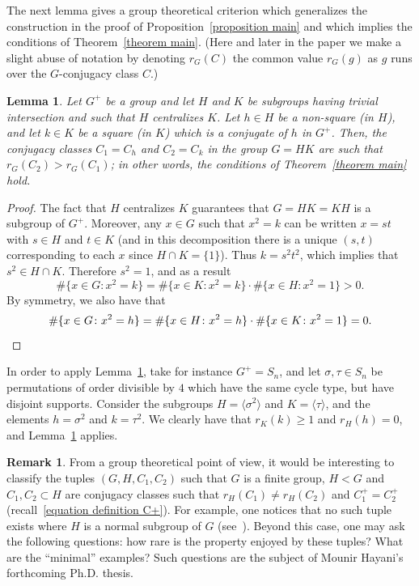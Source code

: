 \documentclass[JEP,XML,SOM,Unicode,NoEqCountersInSection,NoFloatCountersInSection,published]{cedram}
\newtheorem{lemma}[X]{Lemma}
\theoremstyle{definition}
\newtheorem*{remark*}{Remark}
\begin{document}
The next lemma gives a
group theoretical criterion which generalizes the construction in the proof of Proposition~\ref{proposition main} and which implies the conditions of Theorem~\ref{theorem main}. (Here and later in the paper we make a slight abuse of notation by denoting $r_G(C)$ the common value $r_G(g)$ as $g$ runs over the $G$-conjugacy class $C$.)

\begin{lemma}
Let $G^+$ be a group and let $H$ and $K$ be subgroups having trivial intersection and such that $H$ centralizes $K$. Let $h\in H$ be a non-square (in $H$), and let $k\in K$ be a square (in $K$) which is a conjugate of $h$ in $G^+$. Then, the conjugacy classes $C_1=C_h$ and $C_2=C_k$ in the group $G=HK$ are such that $r_G(C_2)> r_G(C_1) $; in other words, the conditions of Theorem~\ref{theorem main} hold.

\label{lemma criterion}
\end{lemma}

\begin{proof}
The fact that $H$ centralizes $K$ guarantees that $G=HK=KH$ is a subgroup of $G^+$. Moreover, any $x\in G$ such that $x^2=k$ can be written $x=st$ with $s\in H$ and $t\in K$ (and in this decomposition there is a unique $(s,t)$ corresponding to each $x$ since
$H\cap K=\{1\}$). Thus $k=s^2t^2$, which implies that $s^2\in H\cap K$. Therefore $s^2=1$, and as a result
\[
\#\{x\in G\colon x^2=k\}=\#\{x\in K\colon x^2=k\}\cdot
\#\{x\in H\colon x^2=1\}>0.\]
By symmetry, we also have that
\[\#\{x\in G\colon x^2=h\}=\#\{x\in H\colon x^2=h\}\cdot
\#\{x\in K\colon x^2=1\}=0.\qedhere
\]
\end{proof}

In order to apply Lemma~\ref{lemma criterion},
take for instance $G^+=S_n$, and let $\sigma,\tau \in S_n$ be permutations of order divisible by $4$ which have the same cycle type, but have disjoint supports. Consider the subgroups $H=\langle \sigma^2 \rangle$ and $K=\langle \tau \rangle$, and the elements $h=\sigma^2$ and $k=\tau^2$. We clearly have that $ r_K(k)\geq 1$ and $r_{H}(h)=0 $, and Lemma~\ref{lemma criterion} applies.

\begin{remark*}
From a group theoretical point of view, it would be interesting to classify the tuples $(G,H,C_1,C_2)$ such that $G$ is a finite group, $H <G$ and $C_1, C_2 \subset H$ are conjugacy classes such that $r_H(C_1)\neq r_H(C_2)$ and $C_1^+=C_2^+$ (recall~\eqref{equation definition C+}). For example, one notices that no such tuple exists where $H$ is a normal subgroup of $G$ (see~\cite[Proof of Lem.\,3.13]{FJ}). Beyond this case, one may ask the following questions: how rare is the property enjoyed by these tuples?
What are the ``minimal'' examples?
Such questions are the subject of Mounir Hayani's forthcoming Ph.D. thesis.
\end{remark*}
\end{document}
